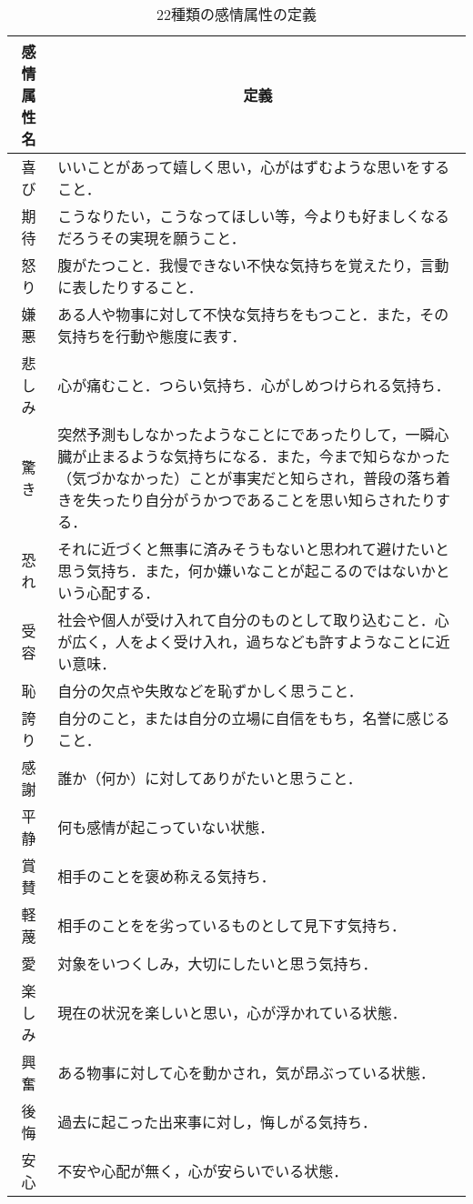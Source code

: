 \documentclass[japanese]{jnlp_1.3c}
\begin{document}
\begin{table}[p]
\begin{center}
\caption{22種類の感情属性の定義}
\begin{tabular}{|c|p{12cm}|}
\hline
感情属性名 & \multicolumn{1}{|c|}{定義} \\ \hline \hline
喜び	& いいことがあって嬉しく思い，心がはずむような思いをすること．\\ \hline
期待	& こうなりたい，こうなってほしい等，今よりも好ましくなるだろうその実現を願うこと．\\ \hline
怒り	& 腹がたつこと．我慢できない不快な気持ちを覚えたり，言動に表したりすること．\\ \hline
嫌悪	& ある人や物事に対して不快な気持ちをもつこと．また，その気持ちを行動や態度に表す．\\ \hline
悲しみ	& 心が痛むこと．つらい気持ち．心がしめつけられる気持ち．\\ \hline
驚き	& 突然予測もしなかったようなことにであったりして，一瞬心臓が止まるような気持ちになる．また，今まで知らなかった（気づかなかった）ことが事実だと知らされ，普段の落ち着きを失ったり自分がうかつであることを思い知らされたりする．\\ \hline
恐れ	& それに近づくと無事に済みそうもないと思われて避けたいと思う気持ち．また，何か嫌いなことが起こるのではないかという心配する．\\ \hline
受容	& 社会や個人が受け入れて自分のものとして取り込むこと．心が広く，人をよく受け入れ，過ちなども許すようなことに近い意味．\\ \hline
恥	& 自分の欠点や失敗などを恥ずかしく思うこと．\\ \hline
誇り	& 自分のこと，または自分の立場に自信をもち，名誉に感じること． \\ \hline
感謝	& 誰か（何か）に対してありがたいと思うこと．\\ \hline
平静	& 何も感情が起こっていない状態． \\ \hline
賞賛	& 相手のことを褒め称える気持ち． \\ \hline
軽蔑	& 相手のことをを劣っているものとして見下す気持ち． \\ \hline
愛	& 対象をいつくしみ，大切にしたいと思う気持ち． \\ \hline
楽しみ	& 現在の状況を楽しいと思い，心が浮かれている状態． \\ \hline
興奮	& ある物事に対して心を動かされ，気が昂ぶっている状態．\\ \hline
後悔	& 過去に起こった出来事に対し，悔しがる気持ち． \\ \hline
安心	& 不安や心配が無く，心が安らいでいる状態．\\ \hline

\end{tabular}
\end{center}
\end{table}
\end{document}
